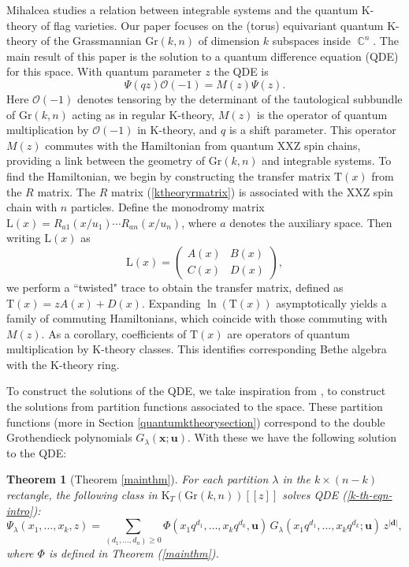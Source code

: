 \documentclass[12pt]{article}
\DeclareMathOperator{\C}{\mathbb{C}}
\newcommand{\OC}{\mathcal{O}}
\newtheorem*{theorem*}{Theorem}
\theoremstyle{plain}
\theoremstyle{definition}
\newcommand{\xb}{\boldsymbol{x}}
\newcommand{\ub}{\boldsymbol{u}}
\begin{document}
Mihalcea \cite{mihalcealectures} studies a relation between integrable systems and the quantum K-theory of flag varieties. Our paper focuses on the (torus) equivariant quantum K-theory of the Grassmannian $\mathrm{Gr}(k,n)$ of dimension $k$ subspaces inside $\C^n$. The main result of this paper is the solution to a quantum difference equation (QDE) for this space. With quantum parameter $z$ the QDE is 
\begin{equation}\label{k-th-eqn-intro}
\Psi(qz) \OC(-1) = M(z) \Psi(z).
\end{equation}
Here $\OC(-1)$ denotes tensoring by the determinant of the tautological subbundle of $\mathrm{Gr}(k,n)$ acting as in regular K-theory, $M(z)$ is the operator of quantum multiplication by $\OC(-1)$ in K-theory, and $q$ is a shift parameter. This operator $M(z)$ commutes with the Hamiltonian from quantum XXZ spin chains, providing a link between the geometry of $\mathrm{Gr}(k,n)$ and integrable systems. To find the Hamiltonian, we begin by constructing the transfer matrix $\mathrm{T}(x)$ from the $R$ matrix. The $R$ matrix (\ref{ktheoryrmatrix}) is associated with the $\mathrm{XXZ}$ spin chain with $n$ particles. Define the monodromy matrix $ \mathrm{L}(x)=R_{a1} (x/u_1)\cdots R_{an} (x/u_n)$, where $a$ denotes the auxiliary space. Then writing $\mathrm{L}(x)$ as
$$\mathrm{L}(x)= \begin{pmatrix}
    A(x) & B(x) \\ 
    C(x) & D(x)
\end{pmatrix},$$
we perform a ``twisted" trace to obtain the transfer matrix, defined as $\mathrm{T}(x) = zA(x)+D(x)$. Expanding $\ln (\mathrm{T}(x))$ asymptotically yields a family of commuting Hamiltonians, which coincide with those commuting with $M(z)$. As a corollary, coefficients of $\mathrm T (x)$ are operators of quantum multiplication by K-theory classes. This identifies corresponding Bethe algebra with the K-theory ring.


To construct the solutions of the QDE, we take inspiration from \cite{aganagic2017quasimapcountsbetheeigenfunctions}, to construct the solutions from partition functions associated to the space. These partition functions (more in Section \ref{quantumktheorysection}) correspond to the double Grothendieck polynomials $G_\lambda (\xb; \ub )$. With these we have the following solution to the QDE:
\begin{theorem*}[Theorem \ref{mainthm}]
For each partition $\lambda$ in the $k \times (n-k)$ rectangle,  the following class in $\mathrm{K}_T(\mathrm{Gr}(k,n))[[z]]$ solves QDE (\ref{k-th-eqn-intro}):
\begin{equation} 
\label{eqn: mainthm}
     \Psi_\lambda(x_1,\dots,x_k,z)
    =\sum_{(d_1, \ldots, d_n) \geq 0} \Phi(x_1q^{d_1},\dots, x_kq^{d_k}, \ub )\, G_{\lambda} \left( x_1q^{d_1},\dots, x_kq^{d_k}; \ub\right)\, z^{|\boldsymbol{d}|}, 
\end{equation}
where $\Phi$ is defined in Theorem (\ref{mainthm}). 
\end{theorem*}
\end{document}
